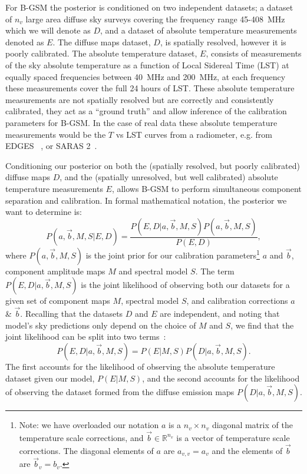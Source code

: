 \documentclass[fleqn,usenatbib]{mnras}
\begin{document}
For B-GSM the posterior is conditioned on two independent datasets; a dataset of $n_v$ large area diffuse sky surveys covering the frequency range 45-408~MHz which we will denote as $D$, and a dataset of absolute temperature measurements denoted as $E$. The diffuse maps dataset, $D$, is spatially resolved, however it is poorly calibrated. The absolute temperature dataset, $E$, consists of measurements of the sky absolute temperature as a function of Local Sidereal Time (LST) at equally spaced frequencies between 40~MHz and 200~MHz, at each frequency these measurements cover the full 24 hours of LST. These absolute temperature measurements are not spatially resolved but are correctly and consistently calibrated, they act as a ``ground truth'' and allow inference of the calibration parameters for B-GSM. In the case of real data these absolute temperature measurements would be the $T$ vs LST curves from a radiometer, e.g. from EDGES ~\citep{Mozdzen2017,Mozdzen2018}, or SARAS 2~\citep{Singh2018}. 

Conditioning our posterior on both the (spatially resolved, but poorly calibrated) diffuse maps $D$, and the (spatially unresolved, but well calibrated) absolute temperature measurements $E$, allows B-GSM to perform simultaneous component separation and calibration. In formal mathematical notation, the posterior we want to determine is:
\begin{equation}
    P(a,\Vec{b},M,S|E,D) = \frac{P(E,D| a,\Vec{b},M,S) P(a,\Vec{b},M,S)}{P(E,D)},
\end{equation}
where $P(a,\Vec{b},M,S)$ is the joint prior for our calibration parameters\footnote{Note: we have overloaded our notation $a$ is a $n_v\times n_v$ diagonal matrix of the temperature scale corrections, and $\Vec{b}\in \mathbb{R}^{n_v}$ is a vector of temperature scale corrections. The diagonal elements of $a$ are $a_{v,v}=a_v$ and the elements of $\Vec{b}$ are $\Vec{b}_v=b_v$.} $a$ and $\Vec{b}$, component amplitude maps $M$ and spectral model $S$. The term $P(E,D| a,\Vec{b},M,S)$ is the joint likelihood of observing both our datasets for a given set of component maps $M$, spectral model $S$, and calibration corrections $a$ \& $\Vec{b}$. Recalling that the datasets $D$ and $E$ are independent, and noting that model's sky predictions only depend on the choice of $M$ and $S$, we find that the joint likelihood can be split into two terms~\citep{Sivia_Skilling}:
\begin{equation}\label{joint likelihood definintion}
    P(E, D| a,\Vec{b},M,S) = P(E|M,S)P(D|a,\Vec{b},M,S).
\end{equation}
The first accounts for the likelihood of observing the absolute temperature dataset given our model, $P(E|M,S)$, and the second accounts for the likelihood of observing the dataset formed from the diffuse emission maps $P(D| a,\Vec{b},M,S)$.
\end{document}
